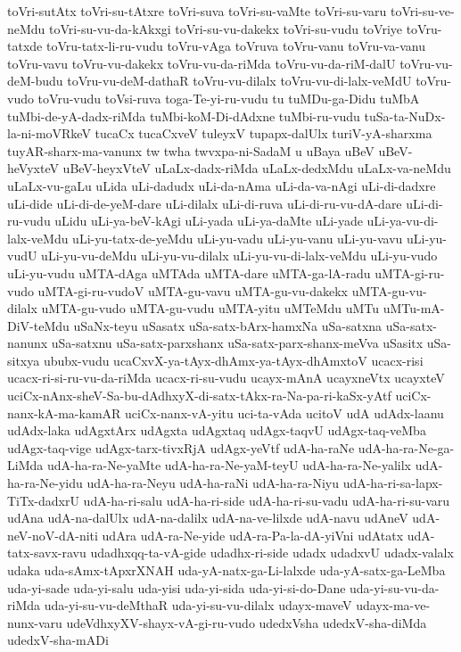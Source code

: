 {toVri-sutAtx
toVri-su-tAtxre
toVri-suva
toVri-su-vaMte
toVri-su-varu
toVri-su-ve-neMdu
toVri-su-vu-da-kAkxgi
toVri-su-vu-dakekx
toVri-su-vudu
toVriye
toVru-tatxde
toVru-tatx-li-ru-vudu
toVru-vAga
toVruva
toVru-vanu
toVru-va-vanu
toVru-vavu
toVru-vu-dakekx
toVru-vu-da-riMda
toVru-vu-da-riM-dalU
toVru-vu-deM-budu
toVru-vu-deM-dathaR
toVru-vu-dilalx
toVru-vu-di-lalx-veMdU
toVru-vudo
toVru-vudu
toVsi-ruva
toga-Te-yi-ru-vudu
tu
tuMDu-ga-Didu
tuMbA
tuMbi-de-yA-dadx-riMda
tuMbi-koM-Di-dAdxne
tuMbi-ru-vudu
tuSa-ta-NuDx-la-ni-moVRkeV
tucaCx
tucaCxveV
tuleyxV
tupapx-dalUlx
turiV-yA-sharxma
tuyAR-sharx-ma-vanunx
tw
twha
twvxpa-ni-SadaM
u
uBaya
uBeV
uBeV-heVyxteV
uBeV-heyxVteV
uLaLx-dadx-riMda
uLaLx-dedxMdu
uLaLx-va-neMdu
uLaLx-vu-gaLu
uLida
uLi-dadudx
uLi-da-nAma
uLi-da-va-nAgi
uLi-di-dadxre
uLi-dide
uLi-di-de-yeM-dare
uLi-dilalx
uLi-di-ruva
uLi-di-ru-vu-dA-dare
uLi-di-ru-vudu
uLidu
uLi-ya-beV-kAgi
uLi-yada
uLi-ya-daMte
uLi-yade
uLi-ya-vu-di-lalx-veMdu
uLi-yu-tatx-de-yeMdu
uLi-yu-vadu
uLi-yu-vanu
uLi-yu-vavu
uLi-yu-vudU
uLi-yu-vu-deMdu
uLi-yu-vu-dilalx
uLi-yu-vu-di-lalx-veMdu
uLi-yu-vudo
uLi-yu-vudu
uMTA-dAga
uMTAda
uMTA-dare
uMTA-ga-lA-radu
uMTA-gi-ru-vudo
uMTA-gi-ru-vudoV
uMTA-gu-vavu
uMTA-gu-vu-dakekx
uMTA-gu-vu-dilalx
uMTA-gu-vudo
uMTA-gu-vudu
uMTA-yitu
uMTeMdu
uMTu
uMTu-mA-DiV-teMdu
uSaNx-teyu
uSasatx
uSa-satx-bArx-hamxNa
uSa-satxna
uSa-satx-nanunx
uSa-satxnu
uSa-satx-parxshanx
uSa-satx-parx-shanx-meVva
uSasitx
uSa-sitxya
ububx-vudu
ucaCxvX-ya-tAyx-dhAmx-ya-tAyx-dhAmxtoV
ucacx-risi
ucacx-ri-si-ru-vu-da-riMda
ucacx-ri-su-vudu
ucayx-mAnA
ucayxneVtx
ucayxteV
uciCx-nAnx-sheV-Sa-bu-dAdhxyX-di-satx-tAkx-ra-Na-pa-ri-kaSx-yAtf
uciCx-nanx-kA-ma-kamAR
uciCx-nanx-vA-yitu
uci-ta-vAda
ucitoV
udA
udAdx-laanu
udAdx-laka
udAgxtArx
udAgxta
udAgxtaq
udAgx-taqvU
udAgx-taq-veMba
udAgx-taq-vige
udAgx-tarx-tivxRjA
udAgx-yeVtf
udA-ha-raNe
udA-ha-ra-Ne-ga-LiMda
udA-ha-ra-Ne-yaMte
udA-ha-ra-Ne-yaM-teyU
udA-ha-ra-Ne-yalilx
udA-ha-ra-Ne-yidu
udA-ha-ra-Neyu
udA-ha-raNi
udA-ha-ra-Niyu
udA-ha-ri-sa-lapx-TiTx-dadxrU
udA-ha-ri-salu
udA-ha-ri-side
udA-ha-ri-su-vadu
udA-ha-ri-su-varu
udAna
udA-na-dalUlx
udA-na-dalilx
udA-na-ve-lilxde
udA-navu
udAneV
udA-neV-noV-dA-niti
udAra
udA-ra-Ne-yide
udA-ra-Pa-la-dA-yiVni
udAtatx
udA-tatx-savx-ravu
udadhxqq-ta-vA-gide
udadhx-ri-side
udadx
udadxvU
udadx-valalx
udaka
uda-sAmx-tApxrXNAH
uda-yA-natx-ga-Li-lalxde
uda-yA-satx-ga-LeMba
uda-yi-sade
uda-yi-salu
uda-yisi
uda-yi-sida
uda-yi-si-do-Dane
uda-yi-su-vu-da-riMda
uda-yi-su-vu-deMthaR
uda-yi-su-vu-dilalx
udayx-maveV
udayx-ma-ve-nunx-varu
udeVdhxyXV-shayx-vA-gi-ru-vudo
udedxVsha
udedxV-sha-diMda
udedxV-sha-mADi
}
